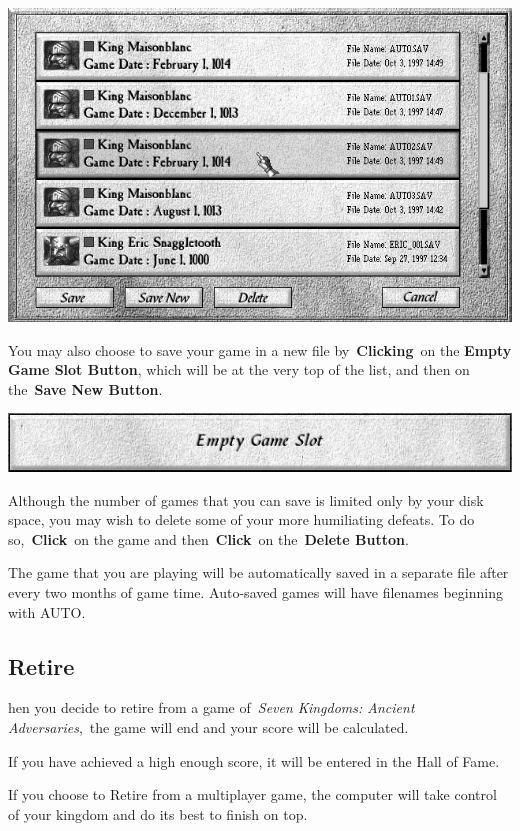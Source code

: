 \begin{center}
	\includegraphics[width=0.9\linewidth]{Isavegame}
\end{center}

You may also choose to save your game in a new file by \textbf{Clicking} on the \textbf{Empty Game Slot Button}, which will be at the very top of the list, and then on the \textbf{Save New Button}.

\begin{center}
	\includegraphics[width=0.7\linewidth]{Isavegame_emptyslot}
\end{center}

Although the number of games that you can save is limited only by your disk space, you may wish to delete some of your more humiliating defeats. To do so, \textbf{Click} on the game and then \textbf{Click} on the \textbf{Delete Button}.

The game that you are playing will be automatically saved in a separate file after every two months of game time. Auto-saved games will have filenames beginning with AUTO.

\subsection{Retire}

hen you decide to retire from a game of \textit{Seven Kingdoms: Ancient Adversaries}, the game will end and your score will be calculated.

If you have achieved a high enough score, it will be entered in the Hall of Fame.

If you choose to Retire from a multiplayer game, the computer will take control of your kingdom and do its best to finish on top.

